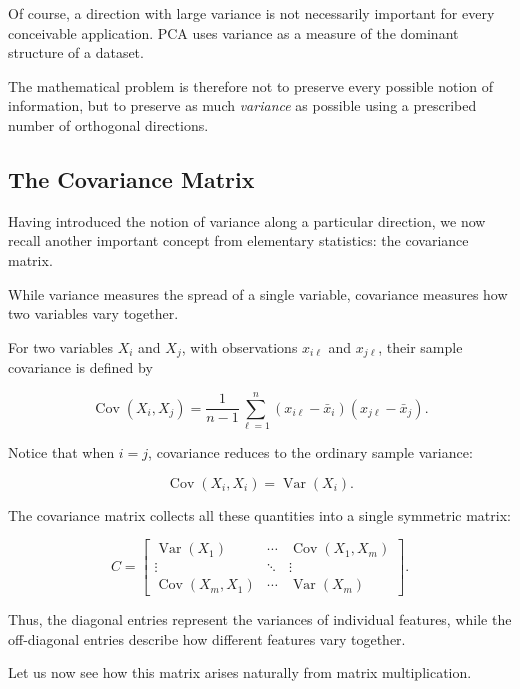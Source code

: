 \documentclass[11pt]{article}
\begin{document}
Of course, a direction with large
variance is not necessarily
important for every conceivable
application. PCA uses variance
as a measure of the dominant
structure of a dataset.

The mathematical problem is
therefore not to preserve every
possible notion of information,
but to preserve as much
\textit{variance} as possible
using a prescribed number
of orthogonal directions.






\subsection{The Covariance Matrix}

Having introduced the notion of variance along
a particular direction, we now recall another
important concept from elementary statistics:
the covariance matrix.

While variance measures the spread of a single
variable, covariance measures how two variables
vary together.

For two variables $X_i$ and $X_j$, with
observations $x_{i\ell}$ and $x_{j\ell}$,
their sample covariance is defined by

\[
\operatorname{Cov}(X_i,X_j)
=
\frac{1}{n-1}
\sum_{\ell=1}^{n}
(x_{i\ell}-\bar{x}_i)
(x_{j\ell}-\bar{x}_j).
\]

Notice that when $i=j$, covariance reduces
to the ordinary sample variance:

\[
\operatorname{Cov}(X_i,X_i)
=
\operatorname{Var}(X_i).
\]

The covariance matrix collects all these
quantities into a single symmetric matrix:

\[
C=
\begin{bmatrix}
\operatorname{Var}(X_1) &
\cdots &
\operatorname{Cov}(X_1,X_m)\\
\vdots & \ddots & \vdots\\
\operatorname{Cov}(X_m,X_1) &
\cdots &
\operatorname{Var}(X_m)
\end{bmatrix}.
\]

Thus, the diagonal entries represent the
variances of individual features, while
the off-diagonal entries describe how
different features vary together.

Let us now see how this matrix arises
naturally from matrix multiplication.
\end{document}
